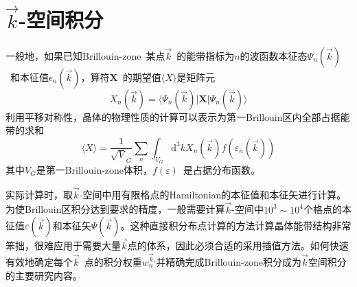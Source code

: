 \section{$\vec k$-空间积分}
一般地，如果已知\textrm{Brillouin-zone~}某点$\vec k$~的能带指标为$n$的波函数本征态$\Psi_n(\vec k)$~和本征值$\epsilon_n(\vec k)$，算符$\mathbf{X}$~的期望值$\langle X \rangle$是矩阵元
\begin{equation}
	X_n(\vec k)=\langle\Psi_n(\vec k)|\mathbf{X}|\Psi_n(\vec k)\rangle 
	\label{eq:solid_kpoint-1}
\end{equation}
利用平移对称性，晶体的物理性质的计算可以表示为第一\textrm{Brillouin}区内全部占据能带的求和
\begin{equation}
	\langle X\rangle=\dfrac1{\sqrt V_G}\sum_n\int_{V_G}\mathrm{d}^3kX_n(\vec k)f(\varepsilon_n(\vec k))
	\label{eq:solid_kpoint-2}
\end{equation}
其中$V_G$是第一\textrm{Brillouin-zone}体积，$f(\varepsilon)$~是占据分布函数。

实际计算时，取$\vec k$-空间中用有限格点的\textrm{Hamiltonian}的本征值和本征矢进行计算。为使\textrm{Brillouin}区积分达到要求的精度，一般需要计算$\vec k$-空间中$10^3\sim10^4$个格点的本征值$\varepsilon(\vec k)$和本征矢$\Psi(\vec k)$。这种直接积分布点计算的方法计算晶体能带结构非常笨拙，很难应用于需要大量$\vec k$点的体系，因此必须合适的采用插值方法。如何快速有效地确定每个$\vec k$~点的积分权重$w_n^{\vec k_i}$并精确完成\textrm{Brillouin-zone}积分成为$\vec k$空间积分的主要研究内容。
